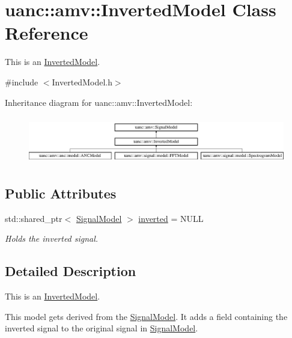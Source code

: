 \hypertarget{classuanc_1_1amv_1_1_inverted_model}{}\section{uanc\+:\+:amv\+:\+:Inverted\+Model Class Reference}
\label{classuanc_1_1amv_1_1_inverted_model}


This is an \hyperlink{classuanc_1_1amv_1_1_inverted_model}{Inverted\+Model}.  




{\ttfamily \#include $<$Inverted\+Model.\+h$>$}

Inheritance diagram for uanc\+:\+:amv\+:\+:Inverted\+Model\+:\begin{figure}[H]
\begin{center}
\leavevmode
\includegraphics[height=2.089552cm]{classuanc_1_1amv_1_1_inverted_model}
\end{center}
\end{figure}
\subsection*{Public Attributes}
\begin{DoxyCompactItemize}
\item 
std\+::shared\+\_\+ptr$<$ \hyperlink{classuanc_1_1amv_1_1_signal_model}{Signal\+Model} $>$ \hyperlink{classuanc_1_1amv_1_1_inverted_model_a739f026c7b9bd28add6c8b04c4976844}{inverted} = N\+U\+LL
\begin{DoxyCompactList}\small\item\em Holds the inverted signal. \end{DoxyCompactList}\end{DoxyCompactItemize}


\subsection{Detailed Description}
This is an \hyperlink{classuanc_1_1amv_1_1_inverted_model}{Inverted\+Model}. 

This model gets derived from the \hyperlink{classuanc_1_1amv_1_1_signal_model}{Signal\+Model}. It adds a field containing the inverted signal to the original signal in \hyperlink{classuanc_1_1amv_1_1_signal_model}{Signal\+Model}. 

